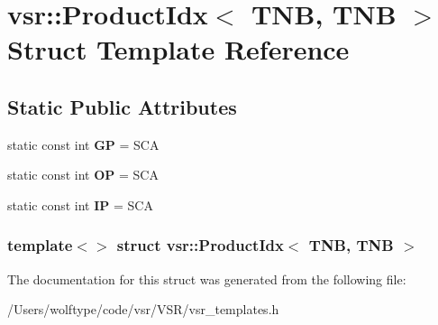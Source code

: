 \hypertarget{structvsr_1_1_product_idx_3_01_t_n_b_00_01_t_n_b_01_4}{\section{vsr\-:\-:Product\-Idx$<$ T\-N\-B, T\-N\-B $>$ Struct Template Reference}
\label{structvsr_1_1_product_idx_3_01_t_n_b_00_01_t_n_b_01_4}
}
\subsection*{Static Public Attributes}
\begin{DoxyCompactItemize}
\item 
\hypertarget{structvsr_1_1_product_idx_3_01_t_n_b_00_01_t_n_b_01_4_a8a046e803f5acad8fbd63704a070b2d9}{static const int {\bfseries G\-P} = S\-C\-A}\label{structvsr_1_1_product_idx_3_01_t_n_b_00_01_t_n_b_01_4_a8a046e803f5acad8fbd63704a070b2d9}

\item 
\hypertarget{structvsr_1_1_product_idx_3_01_t_n_b_00_01_t_n_b_01_4_ab5fbebb006790a0428c59dbadc3b9f90}{static const int {\bfseries O\-P} = S\-C\-A}\label{structvsr_1_1_product_idx_3_01_t_n_b_00_01_t_n_b_01_4_ab5fbebb006790a0428c59dbadc3b9f90}

\item 
\hypertarget{structvsr_1_1_product_idx_3_01_t_n_b_00_01_t_n_b_01_4_ad88deb6e6b265a19a7e2a61df66cdffe}{static const int {\bfseries I\-P} = S\-C\-A}\label{structvsr_1_1_product_idx_3_01_t_n_b_00_01_t_n_b_01_4_ad88deb6e6b265a19a7e2a61df66cdffe}

\end{DoxyCompactItemize}
\subsubsection*{template$<$$>$ struct vsr\-::\-Product\-Idx$<$ T\-N\-B, T\-N\-B $>$}



The documentation for this struct was generated from the following file\-:\begin{DoxyCompactItemize}
\item 
/\-Users/wolftype/code/vsr/\-V\-S\-R/vsr\-\_\-templates.\-h\end{DoxyCompactItemize}
